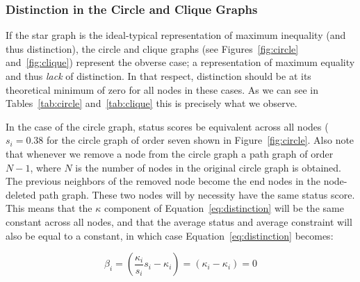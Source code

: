 \documentclass[12pt]{article}
\begin{document}


\subsubsection{Distinction in the Circle and Clique Graphs}

If the star graph is the ideal-typical representation of maximum inequality (and thus distinction), the circle and clique graphs (see Figures~\ref{fig:circle} and~\ref{fig:clique}) represent the obverse case; a representation of maximum equality and thus \textit{lack} of distinction. In that respect, distinction should be at its theoretical minimum of zero for all nodes in these cases. As we can see in Tables~\ref{tab:circle} and~\ref{tab:clique} this is precisely what we observe.

In the case of the circle graph, status scores be equivalent across all nodes ($s_i = 0.38$ for the circle graph of order seven shown in Figure~\ref{fig:circle}. Also note that whenever we remove a node from the circle graph a path graph of order $N-1$, where $N$ is the number of nodes in the original circle graph is obtained. The previous neighbors of the removed node become the end nodes in the node-deleted path graph. These two nodes will by necessity have the same status score. This means that the $\kappa$ component of Equation~\ref{eq:distinction} will be the same constant across all nodes, and that the average status and average constraint will also be equal to a constant, in which case Equation~\ref{eq:distinction} becomes:

\begin{equation}
    \beta_i = \left(\frac{\kappa_i}{s_i}s_i-\kappa_i\right)= (\kappa_i - \kappa_i) =0
    \label{eq:distinction-circle}
\end{equation}
\end{document}
